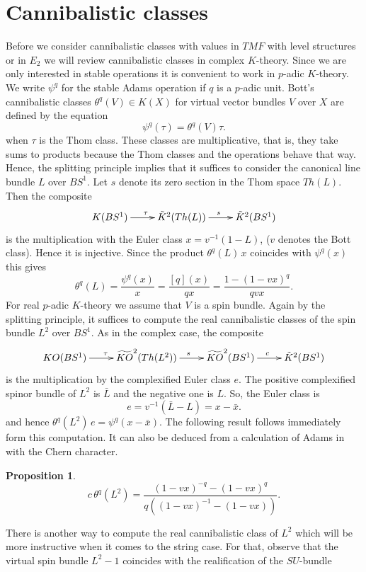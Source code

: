 \documentclass{amsart}
\numberwithin{equation}{section}
\newtheorem{prop}[thm]{Proposition}
\theoremstyle{definition}  %
\newtheorem{set theory}[thm]{Set Theoretic Prelude}
\begin{document}
\section{Cannibalistic classes}
Before we consider cannibalistic classes with values in $TMF$ with level structures or in $E_2$  we will review cannibalistic classes in complex $K$-theory. Since we are only interested in stable operations it is convenient to work in $p$-adic $K$-theory. We write $\psi^q$ for the stable Adams operation if $q$ is a $p$-adic unit. Bott's cannibalistic classes
$\theta^q (V)\in K(X)$ for virtual vector bundles $V$ over $X$ are defined by the equation
$$ \psi^q (\tau) = \theta^q(V)\tau.$$
when  $\tau$ is the Thom class. These classes are multiplicative, that is, they take sums to products because the Thom classes and the operations behave that way. Hence, the splitting principle implies that it suffices to consider the canonical line bundle $L$ over $BS^1$. Let $s$ denote its zero section in the Thom space $Th(L)$. Then the composite 
$$ \xymatrix{ K(BS^1)\ar[r]^\tau & \tilde{K}^2(Th(L))\ar[r]^s &\tilde{K}^2(BS^1)}$$
is the multiplication with the Euler class $x=v^{-1}(1-L)$, ($v$ denotes the Bott class). Hence it is  injective.  Since the product $\theta^q(L)\, x$  coincides with $\psi^q(x)$ this gives
$$ \theta^q(L)=\frac{\psi^q(x)}{x}=\frac{[q](x)}{qx}=\frac{1-(1-vx)^q}{qvx}.$$ 
For real $p$-adic $K$-theory we assume that $V$ is a spin bundle. Again by the splitting principle, it suffices to compute the real cannibalistic classes of the spin bundle $L^2$ over $BS^1$. As in the complex case, the composite
$$ \xymatrix{ KO(BS^1)\ar[r]^\tau & \widetilde{KO}^2(Th(L^2))\ar[r]^s &\widetilde{KO}^2(BS^1)\ar[r]^c&\tilde{K}^2(BS^1)}$$
is the multiplication by the complexified Euler class $e$. The positive complexified spinor bundle of $L^2$ is $\bar{L}$ and the negative one is $L$. So, the Euler class is
$$ e=v^{-1}(\bar{L}-L)=x-\bar{x}.$$
and hence $\theta^q(L^2)\, e = \psi^q(x-\bar{x})$. The following result follows immediately form this computation. It can also be deduced from a calculation of  Adams in \cite{MR0198469}  with the Chern character.
\begin{prop}\cite[Lemma 3.14]{MR2004426}
$$c\, \theta^q(L^2)=\frac{(1-vx)^{-q}-(1-vx)^q}{q((1-vx)^{-1}-(1-vx))}.$$
\end{prop}
There is another way to compute the real cannibalistic class of $L^2$ which will be more instructive when it comes to the string case. For that, observe that the virtual spin bundle $L^2-1$ coincides with the realification of the $SU$-bundle
\end{document}
